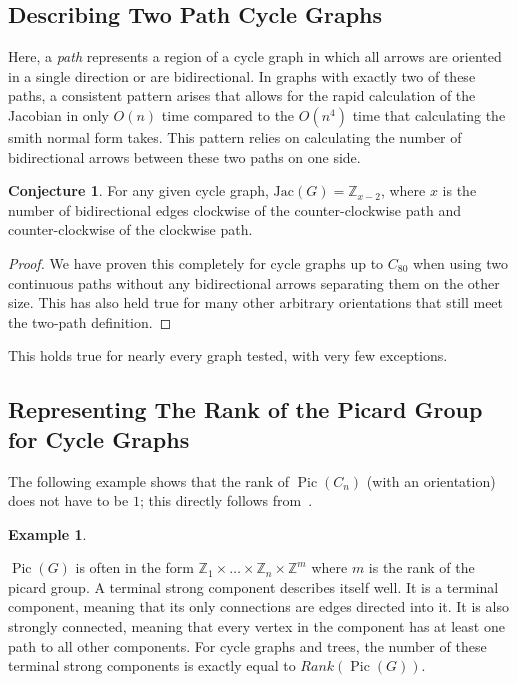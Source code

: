 \documentclass[11pt,reqno]{amsart}
\DeclareMathOperator{\Pic}{Pic}
\newcommand{\Jac}{\textrm{Jac}}{}
\theoremstyle{definition}
\newtheorem{myeg}[mydef]{\textbf{Example}}
\newtheorem{conj}[mydef]{\textbf{Conjecture}}
\theoremstyle{plain}
\begin{document}
	\subsection{Describing Two Path Cycle Graphs}
		Here, a \emph{path} represents a region of a cycle graph in which all arrows are oriented in a single
		direction or are bidirectional.  In graphs with exactly two of these paths, a consistent pattern arises
		that allows for the rapid calculation of the Jacobian in only $O(n)$ time compared to the $O(n^4)$ time
		that calculating the smith normal form takes. This pattern relies on calculating the number
		of bidirectional arrows between these two paths on one side.

		\begin{conj}
			For any given cycle graph, $\Jac(G)=\mathbb{Z}_{x-2}$, where $x$ is the number of
			bidirectional edges clockwise of the counter-clockwise path and counter-clockwise of the clockwise path.
		\end{conj}
		\begin{proof}
			We have proven this completely for cycle graphs up to $C_{80}$ when using two continuous paths without
			any bidirectional arrows separating them on the other size.  This has also held true for many other
			arbitrary orientations that still meet the two-path definition.
		\end{proof}

		This holds true for nearly every graph tested, with very few exceptions.

	\subsection{Representing The Rank of the Picard Group for Cycle Graphs}
		The following example shows that the rank of $\Pic(C_n)$ (with an orientation) does not have to be $1$;
		this directly follows from~\cite[Corollary 3.5]{wagner2000critical}.

		\begin{myeg}
		\end{myeg}

		$\Pic(G)$ is often in the form $\mathbb{Z}_1 \times \dots \times \mathbb{Z}_n \times \mathbb{Z}^m$ where $m$ is
		the rank of the picard group.  A terminal strong component describes itself well.  It is a terminal component,
		meaning that its only connections are edges directed into it.  It is also strongly connected, meaning that every
		vertex in the component has at least one path to all other components.  For cycle graphs and trees, the number
		of these terminal strong components is exactly equal to $Rank(\Pic(G))$.
\end{document}
